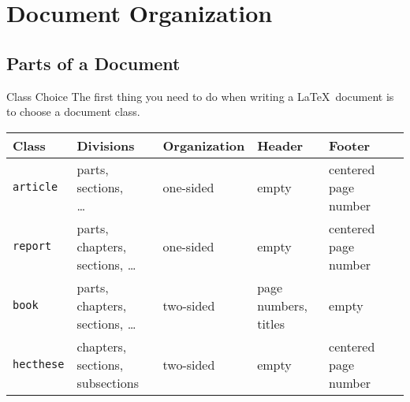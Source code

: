
\section{Document Organization}

\subsection{Parts of a Document}

\begin{frame}[c]{Class Choice}
	The first thing you need to do when writing a \LaTeX\ document is to choose a document class.
	
	\begin{table}[fragile,c]
		\begin{tabularx}{\textwidth}{lllll}
			\arrayrulecolor{grisPrimaire!40}\hline\hline
			\textbf{Class} & \textbf{Divisions} & \textbf{Organization} & \textbf{Header} &	\textbf{Footer} \\
			\hline
			\texttt{article}			&	\makecell{parts, sections,\\ \ldots}				&	one-sided		&	empty			&	centered page number \\
			\texttt{report}				&	\makecell{parts, chapters, \\ sections, \ldots}	&	one-sided		&	empty			&	centered page number \\
			\texttt{book}				&	\makecell{parts, chapters, \\ sections, \ldots}	&	two-sided	&
			\makecell{page numbers, \\ titles}	&	empty \\
			\texttt{hecthese}	&	\makecell{chapters, sections, \\ subsections}		&	two-sided	&
			empty			&	centered page number \\
			\hline\hline
		\end{tabularx}
	\end{table}
\end{frame}

